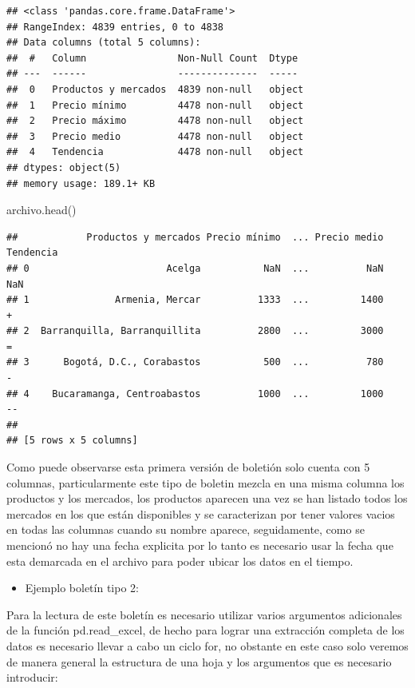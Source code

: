 \documentclass[
]{book}
\newenvironment{Shaded}{\begin{snugshade}}{\end{snugshade}}
\newcommand{\NormalTok}[1]{#1}
\providecommand{\tightlist}{%
  \setlength{\itemsep}{0pt}\setlength{\parskip}{0pt}}
\begin{document}
\begin{verbatim}
## <class 'pandas.core.frame.DataFrame'>
## RangeIndex: 4839 entries, 0 to 4838
## Data columns (total 5 columns):
##  #   Column                Non-Null Count  Dtype 
## ---  ------                --------------  ----- 
##  0   Productos y mercados  4839 non-null   object
##  1   Precio mínimo         4478 non-null   object
##  2   Precio máximo         4478 non-null   object
##  3   Precio medio          4478 non-null   object
##  4   Tendencia             4478 non-null   object
## dtypes: object(5)
## memory usage: 189.1+ KB
\end{verbatim}

\begin{Shaded}
\begin{Highlighting}[]

\NormalTok{archivo.head()}
\end{Highlighting}
\end{Shaded}

\begin{verbatim}
##            Productos y mercados Precio mínimo  ... Precio medio Tendencia
## 0                        Acelga           NaN  ...          NaN       NaN
## 1               Armenia, Mercar          1333  ...         1400         +
## 2  Barranquilla, Barranquillita          2800  ...         3000         =
## 3      Bogotá, D.C., Corabastos           500  ...          780         -
## 4    Bucaramanga, Centroabastos          1000  ...         1000        --
## 
## [5 rows x 5 columns]
\end{verbatim}

Como puede observarse esta primera versión de boletión solo cuenta con 5 columnas, particularmente este tipo de boletin mezcla en una misma columna los productos y los mercados, los productos aparecen una vez se han listado todos los mercados en los que están disponibles y se caracterizan por tener valores vacios en todas las columnas cuando su nombre aparece, seguidamente, como se mencionó no hay una fecha explicita por lo tanto es necesario usar la fecha que esta demarcada en el archivo para poder ubicar los datos en el tiempo.

\begin{itemize}
\tightlist
\item
  Ejemplo boletín tipo 2:
\end{itemize}

Para la lectura de este boletín es necesario utilizar varios argumentos adicionales de la función pd.read\_excel, de hecho para lograr una extracción completa de los datos es necesario llevar a cabo un ciclo for, no obstante en este caso solo veremos de manera general la estructura de una hoja y los argumentos que es necesario introducir:
\end{document}
